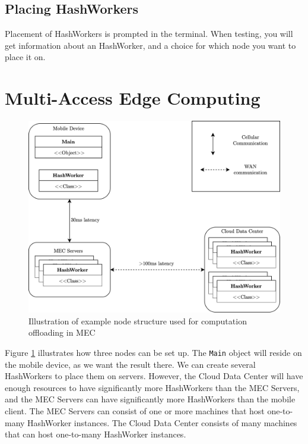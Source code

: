 \subsection{Placing HashWorkers}
Placement of HashWorkers is prompted in the terminal. When testing, you will get information about an HashWorker, and a choice for which node you want to place it on. 















\section{Multi-Access Edge Computing}

\begin{figure}[t]
    \centering
    \includegraphics[scale=1]{chapters/5_implementation/figures/MEC_implementation.png}
    \caption{Illustration of example node structure used for computation offloading in MEC}
    \label{fig:MEC_implementation}
\end{figure}
Figure \ref{fig:MEC_implementation} illustrates how three nodes can be set up. The \verb|Main| object will reside on the mobile device, as we want the result there. We can create several HashWorkers to place them on servers. However, the Cloud Data Center will have enough resources to have significantly more HashWorkers than the MEC Servers, and the MEC Servers can have significantly more HashWorkers than the mobile client. The MEC Servers can consist of one or more machines that host one-to-many HashWorker instances. The Cloud Data Center consists of many machines that can host one-to-many HashWorker instances.




